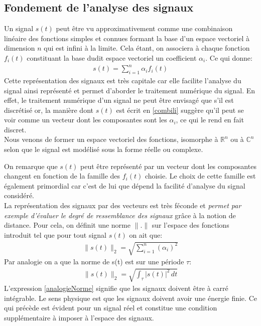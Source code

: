\subsection{Fondement de l'analyse des signaux\cite{KrCourse}} 
Un signal $ s(t) $ peut être vu approximativement comme une combinaison linéaire des fonctions simples et connues formant la base d'un espace vectoriel à dimension $ n $ qui est infini à la limite. Cela étant, on associera à chaque fonction $ f_i(t) $ constituant la base dudit espace vectoriel un coefficient $ \alpha_i $. Ce qui donne:
\begin{eqnarray}\label{combili}
s(t) = \sum_{i=1}^{n}\alpha_if_i(t)
\end{eqnarray}
Cette représentation des signaux est très capitale car elle facilite l'analyse du signal ainsi représenté et permet d'aborder le traitement numérique du signal. En effet, le traitement numérique d'un signal ne peut être envisagé que s'il est discrétisé or, la manière dont $ s(t) $ est écrit en \ref{combili} suggère qu'il peut se voir comme un vecteur dont les composantes sont les $ \alpha_i $, ce qui le rend en fait discret.\\
Nous venons de former un espace vectoriel des fonctions, isomorphe à $ \mathbb{R}^n $ ou à $  \mathbb{C}^n $ selon que le signal est modélisé sous la forme réelle ou complexe.

On remarque que $ s(t) $ peut être représenté par un vecteur dont les composantes changent en fonction de la famille des $ f_i(t) $ choisie. Le choix de cette famille est également primordial car c'est de lui que dépend la facilité d'analyse du signal considéré.\\
La représentation des signaux par des vecteurs est très féconde et \emph{permet par exemple d'évaluer le degré de ressemblance des signaux} grâce à la notion de distance. Pour cela, on définit une norme $ \|.\| $ sur l'espace des fonctions introduit tel que pour tout signal $ s(t) $ on ait que: 
\begin{eqnarray}\label{norme}
\|s(t)\|_{2} = \sqrt{\sum_{i=1}^{n}(\alpha_i)^2}
\end{eqnarray}\newpage
Par analogie on a que la norme de s(t) est sur une période $ \tau $:
\begin{eqnarray}\label{analogieNorme}
\|s(t)\|_{2} = \sqrt{\int_{\tau}|s(t)|^2\,dt}
\end{eqnarray}
L'expression \ref{analogieNorme} signifie que les signaux doivent être à carré intégrable. Le sens physique est que les signaux doivent avoir une énergie finie. Ce qui précède est évident pour un signal réel et constitue une condition supplémentaire à imposer à l'espace des signaux.

